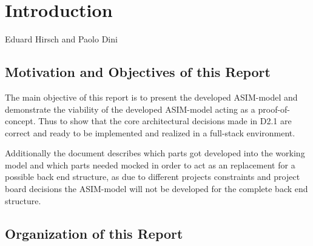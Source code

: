 \chapter{Introduction}
\label{ch:Introduction}

\vspace{-1cm}
\begin{center}
Eduard Hirsch and Paolo Dini
\end{center}


\section{Motivation and Objectives of this Report}

The main objective of this report is to present the developed ASIM-model
and demonstrate the viability of the developed ASIM-model acting as a 
proof-of-concept. Thus to show that the core architectural decisions made in
D2.1 are correct and ready to be implemented and realized in a full-stack
environment.

Additionally the document describes which parts got developed into
the working model and which parts needed mocked in order to act as
an replacement for a possible back end structure, as due to different
projects constraints and project board decisions the ASIM-model will
not be developed for the complete back end structure.

\section{Organization of this Report}



\newpage











